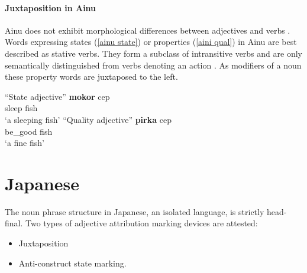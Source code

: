 \paragraph{Juxtaposition in Ainu}
\label{ainu synchr}
Ainu does not exhibit morphological differences between adjectives and verbs \citep[27]{refsing1986}. Words expressing states (\ref{ainu state}) or properties (\ref{aini qual}) in Ainu are best described as stative verbs. They form a subclass of intransitive verbs and are only semantically distinguished from verbs denoting an action \cite[141–142]{refsing1986}. As modifiers of a noun these property words are juxtaposed to the left.
\begin{exe}
\ex {}%
\begin{xlist}
\ex “State adjective” \label{ainu state}
\gll	\textbf{mokor} cep\\
	sleep fish\\
\glt	‘a sleeping fish’
\ex “Quality adjective” \label{aini qual}
\gll	\textbf{pirka} cep\\
	be\_good fish\\
\glt	‘a fine fish’
\end{xlist}
\end{exe}

\section{Japanese}
The noun phrase structure in Japanese, an isolated language, is strictly head-final. Two types of adjective attribution marking devices are attested:
\begin{itemize}
\item Juxtaposition
\item Anti-construct state marking.
\end{itemize}

